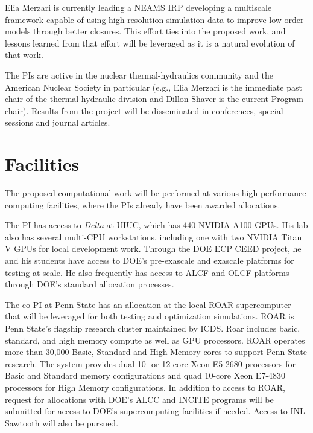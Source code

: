 Elia Merzari is currently leading a NEAMS IRP developing a multiscale framework
capable of using high-resolution simulation data to improve low-order models
through better closures. This effort ties into the proposed work, and lessons
learned from that effort will be leveraged as it is a natural evolution of that
work.

The PIs are active in the nuclear thermal-hydraulics community and the American
Nuclear Society in particular (e.g., Elia Merzari is the immediate past chair
of the thermal-hydraulic division and Dillon Shaver is the current Program
chair). Results from the project will be disseminated in conferences, special
sessions and journal articles.


\section{Facilities}
The proposed computational work will be performed at various high performance
computing facilities, where the PIs already have been awarded allocations.

The PI has access to {\em Delta} at UIUC, which has 440 NVIDIA A100 GPUs.  His
lab also has several multi-CPU workstations, including one with two NVIDIA
Titan V GPUs for local development work.  Through the DOE ECP CEED project, he
and his students have access to DOE's pre-exascale and exascale platforms for
testing at scale.  He also frequently has access to ALCF and OLCF platforms
through DOE's standard allocation processes.


The co-PI at Penn State has an allocation at the local ROAR supercomputer that
will be leveraged for both testing and optimization simulations. ROAR is Penn
State’s flagship research cluster maintained by ICDS. Roar includes basic,
standard, and high memory compute as well as GPU processors. ROAR operates more
than 30,000 Basic, Standard and High Memory cores to support Penn State
research. The system provides dual 10- or 12-core Xeon E5-2680 processors for
Basic and Standard memory configurations and quad 10-core Xeon E7-4830
processors for High Memory configurations. In addition to access to ROAR,
request for allocations with DOE’s ALCC and INCITE programs will be submitted
for access to DOE’s supercomputing facilities if needed. Access to INL Sawtooth
will also be pursued.
%
%
%
%
%
%
